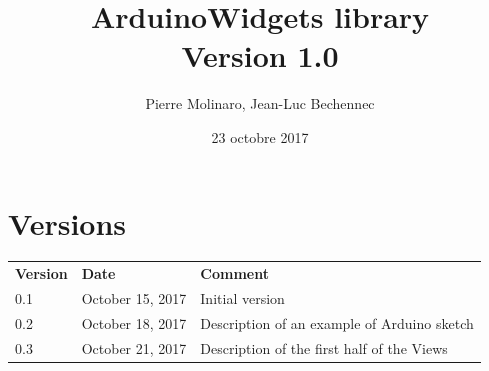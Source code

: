 \documentclass[a4paper,11pt]{extarticle}
\begin{document}
 


\title{\bf \Huge{ArduinoWidgets library\\Version 1.0}}
\author{Pierre Molinaro, Jean-Luc Bechennec}
\date {23 octobre 2017}

\maketitle


\tableofcontents
\listoffigures


\section{Versions}
  \begin{tabular}{llp{10.5cm}}
    \textbf{Version} & \textbf{Date} & \textbf{Comment}\\
    0.1 & October 15, 2017 & Initial version \\
    0.2 & October 18, 2017 & Description of an example of Arduino sketch \\
    0.3 & October 21, 2017 & Description of the first half of the Views


  \end{tabular}
\end{document}

